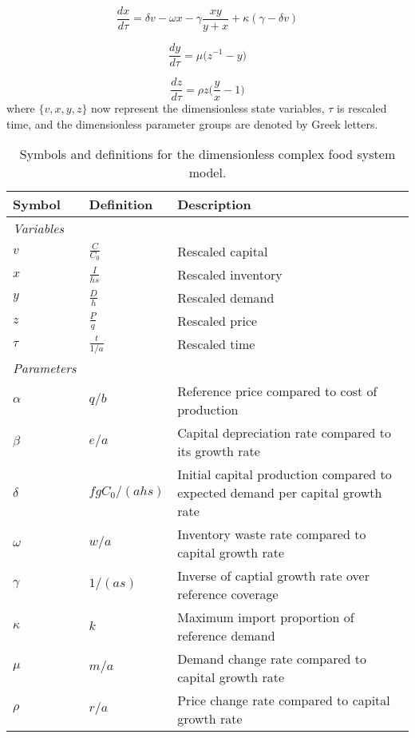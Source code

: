 \documentclass[12pt]{article}
\begin{document}
\begin{equation}
  \frac{dx}{d\tau} = \delta v - \omega x - \gamma \frac{xy}{y + x} + \kappa ( \gamma - \delta v)
\end{equation}

\begin{equation}
  \frac{dy}{d\tau} = \mu \Big( z^{-1} - y\Big)
\end{equation}

\begin{equation}
  \frac{dz}{d\tau} = \rho z\Big(\frac{y}{x} - 1\Big)
\end{equation}
%
where $\{v, x, y, z\}$ now represent the dimensionless state variables, $\tau$ is rescaled time, and the dimensionless parameter groups are denoted by Greek letters.

\begin{table}[t!]
  \centering
  \footnotesize
  \begin{tabular}{p{2cm}p{2cm}p{7cm}}
    \textbf{Symbol} & \textbf{Definition} & \textbf{Description} \\ \hline
    \textit{Variables} &\\
    $v$  & $\frac{C}{C_0}$    & Rescaled capital        \\
    $x$  & $\frac{I}{hs}$  & Rescaled inventory      \\
    $y$  & $\frac{D}{h}$  & Rescaled demand             \\
    $z$  & $\frac{P}{q}$  & Rescaled price               \\
    $\tau$  & $\frac{t}{1/a}$  & Rescaled time\\
    \textit{Parameters} &\\
    $\alpha$   & $q/b$  & Reference price compared to cost of production\\
    $\beta$    & $e/a$  & Capital depreciation rate compared to its growth rate\\
    $\delta$    & $f g C_{0}/(ahs)$ & Initial capital production compared to expected demand per capital growth rate\\
    $\omega$    & $w/a$ & Inventory waste rate compared to capital growth rate\\
    $\gamma$    & $1/(as)$ & Inverse of captial growth rate over reference coverage\\
    $\kappa$    & $k$    & Maximum import proportion of reference demand\\
    $\mu$       & $m/a$  & Demand change rate compared to capital growth rate\\
    $\rho$      & $r/a$  & Price change rate compared to capital growth rate\\
    \hline
  \end{tabular}
  \caption{Symbols and definitions for the dimensionless complex food system model.}
  \label{t_nd_symbols}
\end{table}
\end{document}
